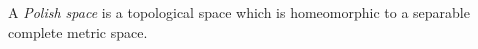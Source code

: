 A \emph{Polish space} is a topological space which is homeomorphic to a separable complete metric space.
